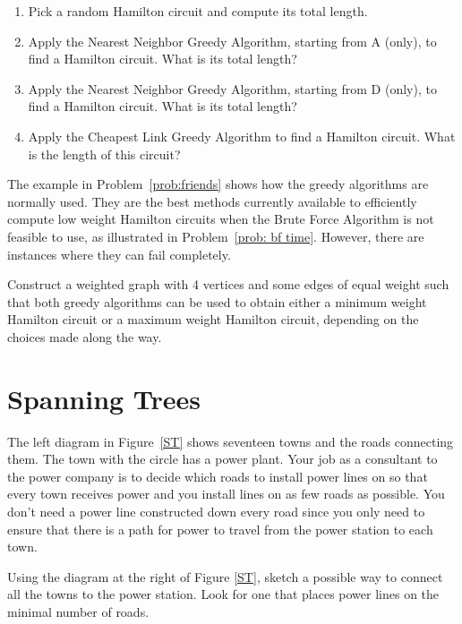    \begin{enumerate}
   \item Pick a random Hamilton circuit and compute its total
   length.
   \item Apply the Nearest Neighbor Greedy Algorithm, starting from A
   (only), to find a Hamilton circuit.  What is its total length?
   \item Apply the Nearest Neighbor Greedy Algorithm, starting from D
   (only), to find a Hamilton circuit.  What is its total length?
   \item Apply the Cheapest Link Greedy Algorithm to find a Hamilton
   circuit.  What is the length of this circuit?
   \end{enumerate}

\noindent The example in Problem~\ref{prob:friends} shows how the greedy algorithms are normally used.   They are the best methods currently available to efficiently compute low weight Hamilton circuits when the Brute Force Algorithm is not feasible to use, as illustrated in Problem~\ref{prob: bf time}.  However, there are instances where they can fail completely.

\begin{prb}
Construct a weighted graph with 4 vertices and some edges of equal weight such that both greedy algorithms can be used to obtain either a minimum weight Hamilton circuit or a maximum weight Hamilton circuit, depending on the choices made along the way.
\end{prb}


\chapter{Spanning Trees}

The left diagram in Figure~\ref{ST} shows seventeen towns and the roads connecting them. The town with the circle has a power plant.  Your job as a consultant to the power company is to decide which roads to install power lines on so that every town receives power and you install lines on as few roads as possible. You don't need a power line constructed down every road since you only need to ensure that there is a path for power to travel from the power station to each town.

\begin{prb}
\label{spt}
Using the diagram at the right of Figure \ref{ST}, sketch a possible way to connect all the towns to the power station.  Look for one that places power lines on the minimal number
of roads.
\end{prb}

